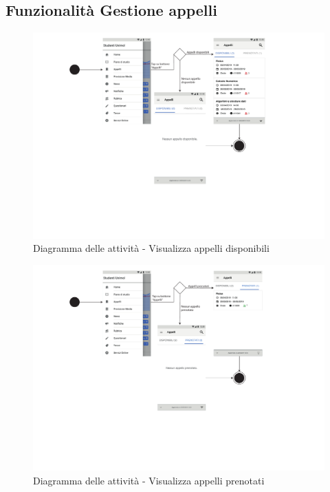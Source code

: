 \subsection{Funzionalità Gestione appelli}

\begin{figure}[h]
	\centering
	\includegraphics[width=6in]{imgs/gruppo1/activity_diagrams/AD6_visualizza_appelli_disponibili.pdf}
	\caption{Diagramma delle attività - Visualizza appelli disponibili}
	\label{diag:visualizzaAppelliDisponibiliAD}
\end{figure}
\newpage

\begin{figure}
	\centering
	\includegraphics[width=6in]{imgs/gruppo1/activity_diagrams/AD7_visualizza_appelli_prenotati.pdf}
	\caption{Diagramma delle attività - Visualizza appelli prenotati}
	\label{diag:visualizzaAppelliPrenotatiAD}
\end{figure}
\newpage

